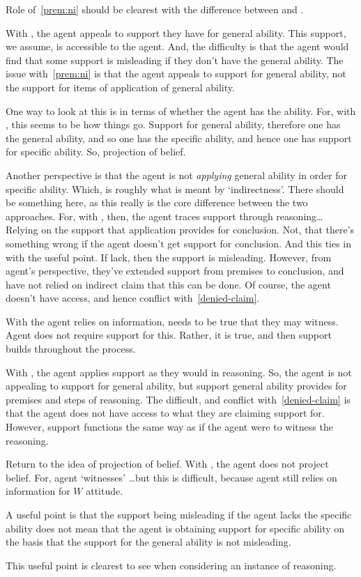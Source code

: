 \begin{note}[\WR{} and \AR{}]
  Role of~\ref{prem:ni} should be clearest with the difference between \AR{} and \WR{}.

  With \AR{}, the agent appeals to support they have for general ability.
  This support, we assume, is accessible to the agent.
  And, the difficulty is that the agent would find that some support is misleading if they don't have the general ability.
  The issue with~\ref{prem:ni} is that the agent appeals to support for general ability, not the support for items of application of general ability.

  One way to look at this is in terms of whether the agent has the ability.
  For, with \AR{}, this seems to be how things go.
  Support for general ability, therefore one has the general ability, and so one has the specific ability, and hence one has support for specific ability.
  So, projection of belief.

  Another perspective is that the agent is not \emph{applying} general ability in order for specific ability.
  Which, is roughly what is meant by `indirectness'.
  There should be something here, as this really is the core difference between the two approaches.
  For, with \WR{}, then, the agent traces support through reasoning\dots
  Relying on the support that application provides for conclusion.
  Not, that there's something wrong if the agent doesn't get support for conclusion.
  And this ties in with the useful point.
  If lack, then the support is misleading.
  However, from agent's perspective, they've extended support from premises to conclusion, and have not relied on indirect claim that this can be done.
  Of course, the agent doesn't have access, and hence conflict with~\ref{denied-claim}.

  With \WR{} the agent relies on information, needs to be true that they may witness.
  Agent does not require support for this.
  Rather, it is true, and then support builds throughout the process.


  With \WR{}, the agent applies support as they would in reasoning.
  So, the agent is not appealing to support for general ability, but support general ability provides for premises and steps of reasoning.
  The difficult, and conflict with~\ref{denied-claim} is that the agent does not have access to what they are claiming support for.
  However, support functions the same way as if the agent were to witness the reasoning.

  Return to the idea of projection of belief.
  With \WR{}, the agent does not project belief.
  For, agent `witnesses' \dots but this is difficult, because agent still relies on information for \(W\) attitude.
  


  A useful point is that the support being misleading if the agent lacks the specific ability does not mean that the agent is obtaining support for specific ability on the basis that the support for the general ability is not misleading.

  This useful point is clearest to see when considering an instance of reasoning.
  
\end{note}

